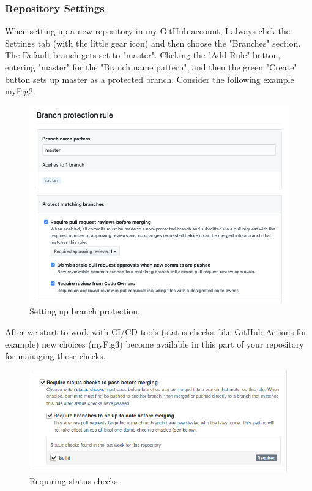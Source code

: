 \hypertarget{repository-settings}{%
\subsubsection{Repository Settings}\label{repository-settings}}

When setting up a new repository in my GitHub account, I always click
the Settings tab (with the little gear icon) and then choose the
"Branches" section. The Default branch gets set to "master". Clicking
the "Add Rule" button, entering "master" for the "Branch name pattern",
and then the green "Create" button sets up master as a protected branch.
Consider the following example {myFig2}.

\begin{figure}
\centering
\includegraphics{../images/github-branch-protection.png}
\caption{Setting up branch protection.}
\end{figure}

After we start to work with CI/CD tools (status checks, like GitHub
Actions for example) new choices ({myFig3}) become available in this
part of your repository for managing those checks.

\begin{figure}
\centering
\includegraphics{../images/guthub-status-check.png}
\caption{Requiring status checks.}
\end{figure}

